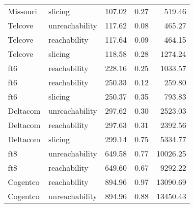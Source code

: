 \begin{tabular}{llrrr}
Missouri & slicing & 107.02 & 0.27 & 519.46 \\
Telcove & unreachability & 117.62 & 0.08 & 465.27 \\
Telcove & reachability & 117.64 & 0.09 & 464.15 \\
Telcove & slicing & 118.58 & 0.28 & 1274.24 \\
ft6 & reachability & 228.16 & 0.25 & 1033.57 \\
ft6 & reachability & 250.33 & 0.12 & 259.80 \\
ft6 & slicing & 250.37 & 0.35 & 793.83 \\
Deltacom & unreachability & 297.62 & 0.30 & 2523.03 \\
Deltacom & reachability & 297.63 & 0.31 & 2392.56 \\
Deltacom & slicing & 299.14 & 0.75 & 5334.77 \\
ft8 & unreachability & 649.58 & 0.77 & 10026.25 \\
ft8 & reachability & 649.60 & 0.67 & 9292.22 \\
Cogentco & reachability & 894.96 & 0.97 & 13090.69 \\
Cogentco & unreachability & 894.96 & 0.88 & 13450.43 \\
\bottomrule
\end{tabular}
